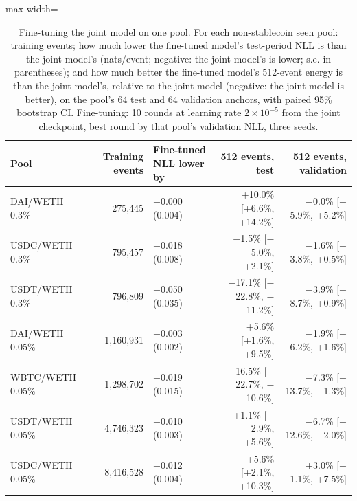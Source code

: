 \documentclass[11pt]{article}
\begin{document}
\begin{table}[t]
\centering
\caption{Fine-tuning the joint model on one pool. For each non-stablecoin seen pool: training events; how much lower the fine-tuned model's test-period NLL is than the joint model's (nats/event; negative: the joint model's is lower; s.e. in parentheses); and how much better the fine-tuned model's 512-event energy is than the joint model's, relative to the joint model (negative: the joint model is better), on the pool's 64 test and 64 validation anchors, with paired 95\% bootstrap CI. Fine-tuning: 10 rounds at learning rate $2\times10^{-5}$ from the joint checkpoint, best round by that pool's validation NLL, three seeds.}\label{tab:10}
\begin{adjustbox}{max width=\linewidth}
\begin{tabular}{lrlrr}
\toprule
Pool & Training events & Fine-tuned NLL lower by & 512 events, test & 512 events, validation \\
\midrule
DAI/WETH 0.3\% & 275,445 & \ensuremath{-}0.000 (0.004) & +10.0\% [+6.6\%, +14.2\%] & \ensuremath{-}0.0\% [\ensuremath{-}5.9\%, +5.2\%] \\
USDC/WETH 0.3\% & 795,457 & \ensuremath{-}0.018 (0.008) & \ensuremath{-}1.5\% [\ensuremath{-}5.0\%, +2.1\%] & \ensuremath{-}1.6\% [\ensuremath{-}3.8\%, +0.5\%] \\
USDT/WETH 0.3\% & 796,809 & \ensuremath{-}0.050 (0.035) & \ensuremath{-}17.1\% [\ensuremath{-}22.8\%, \ensuremath{-}11.2\%] & \ensuremath{-}3.9\% [\ensuremath{-}8.7\%, +0.9\%] \\
DAI/WETH 0.05\% & 1,160,931 & \ensuremath{-}0.003 (0.002) & +5.6\% [+1.6\%, +9.5\%] & \ensuremath{-}1.9\% [\ensuremath{-}6.2\%, +1.6\%] \\
WBTC/WETH 0.05\% & 1,298,702 & \ensuremath{-}0.019 (0.015) & \ensuremath{-}16.5\% [\ensuremath{-}22.7\%, \ensuremath{-}10.6\%] & \ensuremath{-}7.3\% [\ensuremath{-}13.7\%, \ensuremath{-}1.3\%] \\
USDT/WETH 0.05\% & 4,746,323 & \ensuremath{-}0.010 (0.003) & +1.1\% [\ensuremath{-}2.9\%, +5.6\%] & \ensuremath{-}6.7\% [\ensuremath{-}12.6\%, \ensuremath{-}2.0\%] \\
USDC/WETH 0.05\% & 8,416,528 & +0.012 (0.004) & +5.6\% [+2.1\%, +10.3\%] & +3.0\% [\ensuremath{-}1.1\%, +7.5\%] \\
\bottomrule
\end{tabular}
\end{adjustbox}
\end{table}
\end{document}
